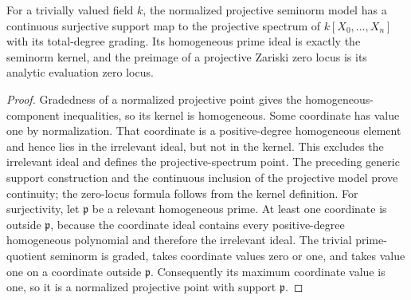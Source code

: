 \begin{theorem}
\label{projective:support}
\leanok
{}
For a trivially valued field $k$, the normalized projective seminorm model
has a continuous surjective support map to the projective spectrum of
$k[X_0,\ldots,X_n]$ with its total-degree grading. Its homogeneous prime
ideal is exactly the seminorm kernel, and the preimage of a projective
Zariski zero locus is its analytic evaluation zero locus.
\end{theorem}
\begin{proof}
Gradedness of a normalized projective point gives the homogeneous-component
inequalities, so its kernel is homogeneous. Some coordinate has value one
by normalization. That coordinate is a positive-degree homogeneous element
and hence lies in the irrelevant ideal, but not in the kernel. This excludes
the irrelevant ideal and defines the projective-spectrum point. The preceding
generic support construction and the continuous inclusion of the projective
model prove continuity; the zero-locus formula follows from the kernel definition.
For surjectivity, let $\mathfrak p$ be a relevant homogeneous prime. At least
one coordinate is outside $\mathfrak p$, because the coordinate ideal contains
every positive-degree homogeneous polynomial and therefore the irrelevant ideal.
The trivial prime-quotient seminorm is graded, takes coordinate values zero
or one, and takes value one on a coordinate outside $\mathfrak p$.
Consequently its maximum coordinate value is one, so it is a normalized
projective point with support $\mathfrak p$.
\end{proof}
